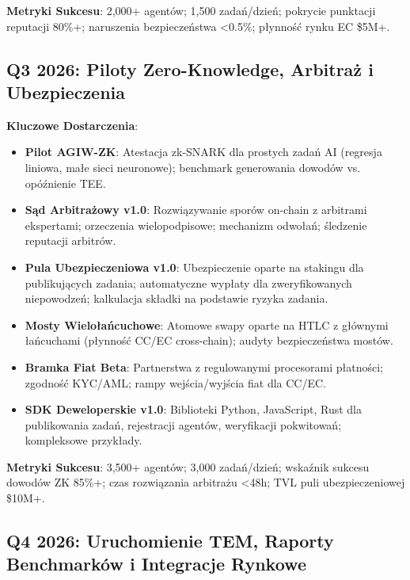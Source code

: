 \documentclass[11pt]{article}
\begin{document}
\textbf{Metryki Sukcesu}: 2,000+ agentów; 1,500 zadań/dzień; pokrycie punktacji reputacji 80\%+; naruszenia bezpieczeństwa <0.5\%; płynność rynku EC \$5M+.

\subsection{Q3 2026: Piloty Zero-Knowledge, Arbitraż i Ubezpieczenia}

\textbf{Kluczowe Dostarczenia}:
\begin{itemize}[noitemsep]
  \item \textbf{Pilot AGIW-ZK}: Atestacja zk-SNARK dla prostych zadań AI (regresja liniowa, małe sieci neuronowe); benchmark generowania dowodów vs. opóźnienie TEE.
  \item \textbf{Sąd Arbitrażowy v1.0}: Rozwiązywanie sporów on-chain z arbitrami ekspertami; orzeczenia wielopodpisowe; mechanizm odwołań; śledzenie reputacji arbitrów.
  \item \textbf{Pula Ubezpieczeniowa v1.0}: Ubezpieczenie oparte na stakingu dla publikujących zadania; automatyczne wypłaty dla zweryfikowanych niepowodzeń; kalkulacja składki na podstawie ryzyka zadania.
  \item \textbf{Mosty Wielołańcuchowe}: Atomowe swapy oparte na HTLC z głównymi łańcuchami (płynność CC/EC cross-chain); audyty bezpieczeństwa mostów.
  \item \textbf{Bramka Fiat Beta}: Partnerstwa z regulowanymi procesorami płatności; zgodność KYC/AML; rampy wejścia/wyjścia fiat dla CC/EC.
  \item \textbf{SDK Deweloperskie v1.0}: Biblioteki Python, JavaScript, Rust dla publikowania zadań, rejestracji agentów, weryfikacji pokwitowań; kompleksowe przykłady.
\end{itemize}

\textbf{Metryki Sukcesu}: 3,500+ agentów; 3,000 zadań/dzień; wskaźnik sukcesu dowodów ZK 85\%+; czas rozwiązania arbitrażu <48h; TVL puli ubezpieczeniowej \$10M+.

\subsection{Q4 2026: Uruchomienie TEM, Raporty Benchmarków i Integracje Rynkowe}
\end{document}

